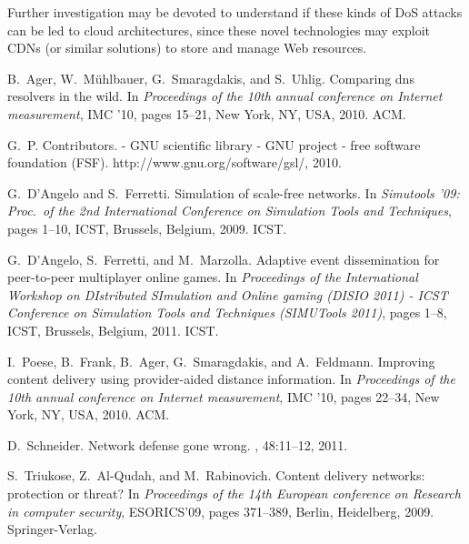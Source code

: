 \documentclass{IEEEtran}
\begin{document}
Further investigation may be devoted to understand if these kinds of DoS attacks can be led to cloud architectures, since these novel technologies may exploit CDNs (or similar solutions) to store and manage Web resources.

\begin{thebibliography}{1}

B.~Ager, W.~M\"{u}hlbauer, G.~Smaragdakis, and S.~Uhlig.
\newblock Comparing dns resolvers in the wild.
\newblock In {\em Proceedings of the 10th annual conference on Internet
  measurement}, IMC '10, pages 15--21, New York, NY, USA, 2010. ACM.

G.~P. Contributors.
 - {GNU} scientific library - {GNU} project - free software
  foundation {(FSF)}.
\newblock http://www.gnu.org/software/gsl/, 2010.

G.~D'Angelo and S.~Ferretti.
\newblock Simulation of scale-free networks.
\newblock In {\em Simutools '09: Proc.~of the 2nd International Conference on
  Simulation Tools and Techniques}, pages 1--10, ICST, Brussels, Belgium, 2009.
  ICST.

G.~D'Angelo, S.~Ferretti, and M.~Marzolla.
\newblock Adaptive event dissemination for peer-to-peer multiplayer online
  games.
\newblock In {\em Proceedings of the International Workshop on DIstributed
  SImulation and Online gaming (DISIO 2011) - ICST Conference on Simulation
  Tools and Techniques (SIMUTools 2011)}, pages 1--8, ICST, Brussels, Belgium,
  2011. ICST.

I.~Poese, B.~Frank, B.~Ager, G.~Smaragdakis, and A.~Feldmann.
\newblock Improving content delivery using provider-aided distance information.
\newblock In {\em Proceedings of the 10th annual conference on Internet
  measurement}, IMC '10, pages 22--34, New York, NY, USA, 2010. ACM.

D.~Schneider.
\newblock Network defense gone wrong.
, 48:11--12, 2011.

S.~Triukose, Z.~Al-Qudah, and M.~Rabinovich.
\newblock Content delivery networks: protection or threat?
\newblock In {\em Proceedings of the 14th European conference on Research in
  computer security}, ESORICS'09, pages 371--389, Berlin, Heidelberg, 2009.
  Springer-Verlag.

\end{thebibliography}
\end{document}
